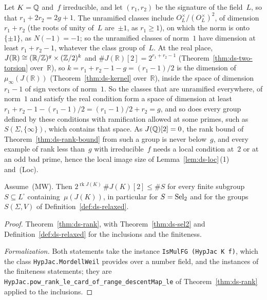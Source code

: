 \begin{remark}
\label{rem:ds-dimension}
Let $K = \mathbb{Q}$ and~$f$ irreducible, and let $(r_1, r_2)$ be the signature of the field~$L$, so that
$r_1 + 2r_2 = 2g + 1$. The unramified classes include $O_L^\times/(O_L^\times)^2$, of dimension
$r_1 + r_2$ (the roots of unity of~$L$ are~$\pm 1$, as $r_1 \ge 1$), on which the norm is onto
$\{\pm 1\}$, as $N(-1) = -1$; so the unramified classes of norm~$1$ have dimension at least
$r_1 + r_2 - 1$, whatever the class group of~$L$. At the real place,
$J(\mathbb R) \cong (\mathbb R/\mathbb{Z})^g \times (\mathbb{Z}/2)^k$ and
$\#J(\mathbb R)[2] = 2^{r_1 + r_2 - 1}$ (Theorem~\ref{thm:ds-two-torsion} over~$\mathbb R$), so
$k = r_1 + r_2 - 1 - g = (r_1 - 1)/2$ is the dimension of $\mu_\infty(J(\mathbb R))$
(Theorem~\ref{thm:ds-kernel} over~$\mathbb R$), inside the space of dimension $r_1 - 1$ of sign
vectors of norm~$1$. So the classes that are unramified everywhere, of norm~$1$ and satisfy the
real condition form a space of dimension at least
$r_1 + r_2 - 1 - (r_1 - 1)/2 = (r_1 - 1)/2 + r_2 = g$, and so does every group defined by these
conditions with ramification allowed at some primes, such as $S(\Sigma, \{\infty\})$, which
contains that space. As $J(\mathbb{Q})[2] = 0$, the rank bound of Theorem~\ref{thm:ds-rank-bound} from
such a group is never below~$g$, and every example of rank less than~$g$ with irreducible~$f$
needs a local condition at~$2$ or at an odd bad prime, hence the local image size of
Lemma~\ref{lem:ds-loc}\,(1) and~(Loc).
\end{remark}

\begin{theorem}
\label{thm:ds-rank-bound}
\leanok
{}
Assume~(MW). Then $2^{\operatorname{rk} J(K)}\,\#J(K)[2] \le \#S$ for every finite subgroup
$S \subseteq L^\square$ containing~$\mu(J(K))$, in particular for $S = \operatorname{Sel}_2$ and for the
groups~$S(\Sigma, V)$ of Definition~\ref{def:ds-relaxed}.
\end{theorem}

\begin{proof}
\leanok
{}
Theorem~\ref{thm:ds-rank}, with Theorem~\ref{thm:ds-sel2} and Definition~\ref{def:ds-relaxed} for
the inclusions and the finiteness.

\emph{Formalization.} Both statements take the instance \texttt{IsMulFG (HypJac K f)}, which the
class \texttt{HypJac.MordellWeil} provides over a number field, and the instances of the
finiteness statements; they are \texttt{HypJac.pow\_rank\_le\_card\_of\_range\_descentMap\_le} of
Theorem~\ref{thm:ds-rank} applied to the inclusions.
\end{proof}

